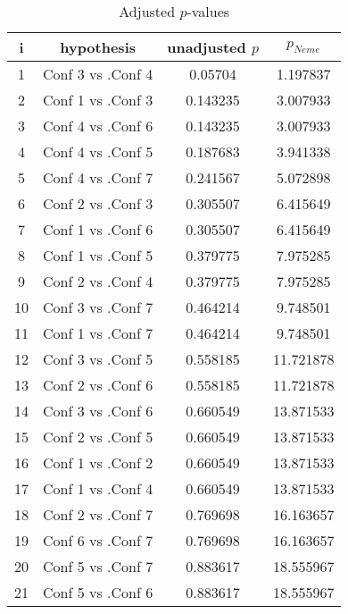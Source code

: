 \documentclass[a4paper,10pt]{article}
\begin{document}
\begin{landscape}
\begin{table}[!htp]
\centering\scriptsize
\begin{tabular}{cccc}
i&hypothesis&unadjusted $p$&$p_{Neme}$\\
\hline1&Conf 3 vs .Conf 4&0.05704&1.197837\\
2&Conf 1 vs .Conf 3&0.143235&3.007933\\
3&Conf 4 vs .Conf 6&0.143235&3.007933\\
4&Conf 4 vs .Conf 5&0.187683&3.941338\\
5&Conf 4 vs .Conf 7&0.241567&5.072898\\
6&Conf 2 vs .Conf 3&0.305507&6.415649\\
7&Conf 1 vs .Conf 6&0.305507&6.415649\\
8&Conf 1 vs .Conf 5&0.379775&7.975285\\
9&Conf 2 vs .Conf 4&0.379775&7.975285\\
10&Conf 3 vs .Conf 7&0.464214&9.748501\\
11&Conf 1 vs .Conf 7&0.464214&9.748501\\
12&Conf 3 vs .Conf 5&0.558185&11.721878\\
13&Conf 2 vs .Conf 6&0.558185&11.721878\\
14&Conf 3 vs .Conf 6&0.660549&13.871533\\
15&Conf 2 vs .Conf 5&0.660549&13.871533\\
16&Conf 1 vs .Conf 2&0.660549&13.871533\\
17&Conf 1 vs .Conf 4&0.660549&13.871533\\
18&Conf 2 vs .Conf 7&0.769698&16.163657\\
19&Conf 6 vs .Conf 7&0.769698&16.163657\\
20&Conf 5 vs .Conf 7&0.883617&18.555967\\
21&Conf 5 vs .Conf 6&0.883617&18.555967\\
\hline
\end{tabular}
\caption{Adjusted $p$-values}
\end{table}

\end{landscape}
\end{document}
